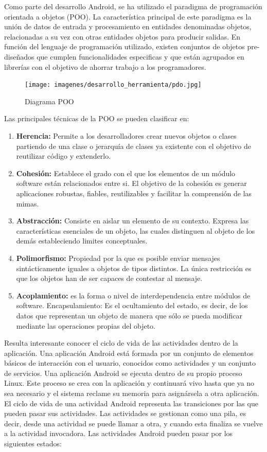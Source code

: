 \documentclass[a4paper,11pt]{book}
\begin{document}
Como parte del desarrollo Android, se ha utilizado el paradigma de programación orientada a objetos (POO)\cite{ood}. La característica principal de este paradigma es la unión de datos de entrada y procesamiento en entidades denominadas objetos,  relacionadas a su vez con otras entidades objetos para producir salidas. En función del lenguaje de programación utilizado, existen conjuntos de objetos pre-diseñados que cumplen funcionalidades especificas y que están agrupados en librerías con el objetivo de ahorrar trabajo a los programadores.


\begin{figure}[H] 
\centering 
\texttt{[image: imagenes/desarrollo\_herramienta/pdo.jpg]}
\caption{ Diagrama POO\cite{poo}}
\end{figure}


Las principales técnicas de la POO se pueden clasificar en:


\begin{enumerate}
\item \textbf{Herencia:} Permite a los desarrolladores crear nuevos objetos o clases partiendo de una clase o jerarquía de clases ya existente con el objetivo de reutilizar código y extenderlo. 
\item \textbf{Cohesión:} Establece el grado con el que los elementos de un módulo software están relacionados entre si. El objetivo de la cohesión es generar aplicaciones robustas, fiables, reutilizables y facilitar la comprensión de las mimas.
\item \textbf{Abstracción:} Consiste en aislar un elemento de su contexto. Expresa las características esenciales de un objeto, las cuales distinguen al objeto de los demás estableciendo limites conceptuales.
\item \textbf{Polimorfismo:} Propiedad por la que es posible enviar mensajes sintácticamente iguales a objetos de tipos distintos. La única restricción es que los objetos han de ser capaces de contestar al mensaje. 
\item \textbf{Acoplamiento:} es la forma o nivel de interdependencia entre módulos de software. 
 Encapsulamiento: Es el ocultamiento del estado, es decir, de los datos que representan un objeto de manera que sólo se pueda modificar mediante las operaciones propias del objeto.
\end{enumerate}


Resulta interesante conocer el ciclo de vida\cite{col} de las actividades dentro de la aplicación. Una aplicación Android está formada por un conjunto de elementos básicos de interacción con el usuario, conocidos como actividades y un conjunto de servicios. Una aplicación Android se ejecuta dentro de su propio proceso Linux. Este proceso se crea con la aplicación y continuará vivo hasta que ya no sea necesario y el sistema reclame su memoria para asignársela a otra aplicación. El ciclo de vida de una actividad Android representa las transiciones por las que pueden pasar sus actividades. Las actividades se gestionan como una pila, es decir, desde una actividad se puede llamar a otra, y cuando esta finaliza se vuelve a la actividad invocadora. Las actividades Android pueden pasar por los siguientes estados:
\end{document}
